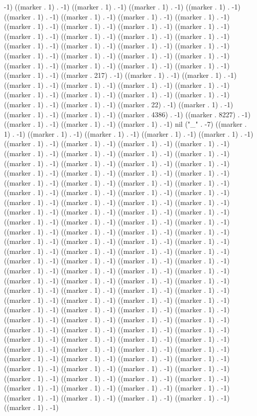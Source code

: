 -1) ((marker . 1) . -1) ((marker . 1) . -1) ((marker . 1) . -1) ((marker . 1) . -1) ((marker . 1) . -1) ((marker . 1) . -1) ((marker . 1) . -1) ((marker . 1) . -1) ((marker . 1) . -1) ((marker . 1) . -1) ((marker . 1) . -1) ((marker . 1) . -1) ((marker . 1) . -1) ((marker . 1) . -1) ((marker . 1) . -1) ((marker . 1) . -1) ((marker . 1) . -1) ((marker . 1) . -1) ((marker . 1) . -1) ((marker . 1) . -1) ((marker . 1) . -1) ((marker . 1) . -1) ((marker . 1) . -1) ((marker . 1) . -1) ((marker . 1) . -1) ((marker . 1) . -1) ((marker . 1) . -1) ((marker . 1) . -1) ((marker . 1) . -1) ((marker . 217) . -1) ((marker . 1) . -1) ((marker . 1) . -1) ((marker . 1) . -1) ((marker . 1) . -1) ((marker . 1) . -1) ((marker . 1) . -1) ((marker . 1) . -1) ((marker . 1) . -1) ((marker . 1) . -1) ((marker . 1) . -1) ((marker . 1) . -1) ((marker . 1) . -1) ((marker . 22) . -1) ((marker . 1) . -1) ((marker . 1) . -1) ((marker . 1) . -1) ((marker . 4386) . -1) ((marker . 8227) . -1) ((marker . 1) . -1) ((marker . 1) . -1) ((marker . 1) . -1) nil ("_" . -7) ((marker . 1) . -1) ((marker . 1) . -1) ((marker . 1) . -1) ((marker . 1) . -1) ((marker . 1) . -1) ((marker . 1) . -1) ((marker . 1) . -1) ((marker . 1) . -1) ((marker . 1) . -1) ((marker . 1) . -1) ((marker . 1) . -1) ((marker . 1) . -1) ((marker . 1) . -1) ((marker . 1) . -1) ((marker . 1) . -1) ((marker . 1) . -1) ((marker . 1) . -1) ((marker . 1) . -1) ((marker . 1) . -1) ((marker . 1) . -1) ((marker . 1) . -1) ((marker . 1) . -1) ((marker . 1) . -1) ((marker . 1) . -1) ((marker . 1) . -1) ((marker . 1) . -1) ((marker . 1) . -1) ((marker . 1) . -1) ((marker . 1) . -1) ((marker . 1) . -1) ((marker . 1) . -1) ((marker . 1) . -1) ((marker . 1) . -1) ((marker . 1) . -1) ((marker . 1) . -1) ((marker . 1) . -1) ((marker . 1) . -1) ((marker . 1) . -1) ((marker . 1) . -1) ((marker . 1) . -1) ((marker . 1) . -1) ((marker . 1) . -1) ((marker . 1) . -1) ((marker . 1) . -1) ((marker . 1) . -1) ((marker . 1) . -1) ((marker . 1) . -1) ((marker . 1) . -1) ((marker . 1) . -1) ((marker . 1) . -1) ((marker . 1) . -1) ((marker . 1) . -1) ((marker . 1) . -1) ((marker . 1) . -1) ((marker . 1) . -1) ((marker . 1) . -1) ((marker . 1) . -1) ((marker . 1) . -1) ((marker . 1) . -1) ((marker . 1) . -1) ((marker . 1) . -1) ((marker . 1) . -1) ((marker . 1) . -1) ((marker . 1) . -1) ((marker . 1) . -1) ((marker . 1) . -1) ((marker . 1) . -1) ((marker . 1) . -1) ((marker . 1) . -1) ((marker . 1) . -1) ((marker . 1) . -1) ((marker . 1) . -1) ((marker . 1) . -1) ((marker . 1) . -1) ((marker . 1) . -1) ((marker . 1) . -1) ((marker . 1) . -1) ((marker . 1) . -1) ((marker . 1) . -1) ((marker . 1) . -1) ((marker . 1) . -1) ((marker . 1) . -1) ((marker . 1) . -1) ((marker . 1) . -1) ((marker . 1) . -1) ((marker . 1) . -1) ((marker . 1) . -1) ((marker . 1) . -1) ((marker . 1) . -1) ((marker . 1) . -1) ((marker . 1) . -1) ((marker . 1) . -1) ((marker . 1) . -1) ((marker . 1) . -1) ((marker . 1) . -1) ((marker . 1) . -1) ((marker . 1) . -1) ((marker . 1) . -1) ((marker . 1) . -1) ((marker . 1) . -1) ((marker . 1) . -1) ((marker . 1) . -1) ((marker . 1) . -1) ((marker . 1) . -1) ((marker . 1) . -1) ((marker . 1) . -1) ((marker . 1) . -1) ((marker . 1) . -1) ((marker . 1) . -1) ((marker . 1) . -1) ((marker . 1) . -1) ((marker . 1) . -1) ((marker . 1) . -1) ((marker . 1) . -1) 